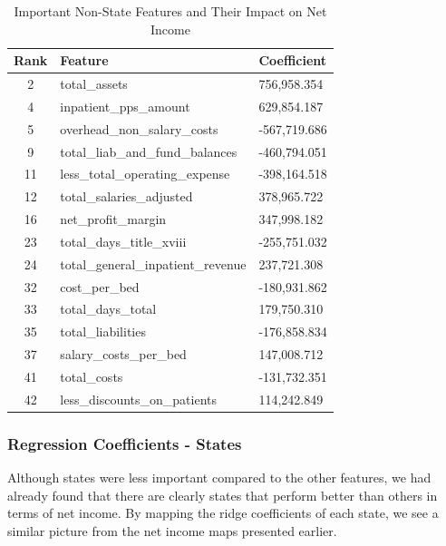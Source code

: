 \documentclass{article}
\theoremstyle{mytheoremstyle}
\theoremstyle{mytheoremstyle}
\theoremstyle{myproblemstyle}
\begin{document}
\begin{table}[ht]
\centering
\caption{Important Non-State Features and Their Impact on Net Income}
\begin{tabular}{@{}cll@{}}
\toprule
Rank & Feature & Coefficient \\
\midrule
2 & total\_assets & 756,958.354 \\
4 & inpatient\_pps\_amount & 629,854.187 \\
5 & overhead\_non\_salary\_costs & -567,719.686 \\
9 & total\_liab\_and\_fund\_balances & -460,794.051 \\
11 & less\_total\_operating\_expense & -398,164.518 \\
12 & total\_salaries\_adjusted & 378,965.722 \\
16 & net\_profit\_margin & 347,998.182 \\
23 & total\_days\_title\_xviii & -255,751.032 \\
24 & total\_general\_inpatient\_revenue & 237,721.308 \\
32 & cost\_per\_bed & -180,931.862 \\
33 & total\_days\_total & 179,750.310 \\
35 & total\_liabilities & -176,858.834 \\
37 & salary\_costs\_per\_bed & 147,008.712 \\
41 & total\_costs & -131,732.351 \\
42 & less\_discounts\_on\_patients & 114,242.849 \\
\bottomrule
\end{tabular}
\label{tab:non_state_important_features}
\end{table}
\pagebreak


\subsubsection{Regression Coefficients - States}

Although states were less important compared to the other features, we had already found that there are clearly states that perform better than others in terms of net income. By mapping the ridge coefficients of each state, we see a similar picture from the net income maps presented earlier.
\end{document}

